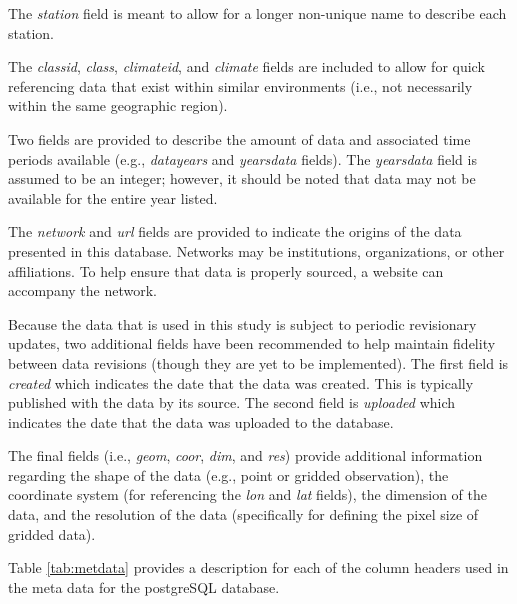 The \emph{station} field is meant to allow for a longer non-unique name to describe each station.

The  \emph{classid}, \emph{class}, \emph{climateid}, and \emph{climate} fields are included to allow for quick referencing data that exist within similar environments (i.e., not necessarily within the same geographic region). 

Two fields are provided to describe the amount of data and associated time periods available (e.g., \emph{data\textunderscore years} and \emph{years\textunderscore data} fields). 
The \emph{years\textunderscore data} field is assumed to be an integer; however, it should be noted that data may not be available for the entire year listed.

The \emph{network} and \emph{url} fields are provided to indicate the origins of the data presented in this database.  
Networks may be institutions, organizations, or other affiliations.  
To help ensure that data is properly sourced, a website can accompany the network.  

Because the data that is used in this study is subject to periodic revisionary updates, two additional fields have been recommended to help maintain fidelity between data revisions (though they are yet to be implemented).  
The first field is \emph{created} which indicates the date that the data was created.  
This is typically published with the data by its source.  
The second field is \emph{uploaded} which indicates the date that the data was uploaded to the database.  

The final fields (i.e., \emph{geom}, \emph{coor}, \emph{dim}, and \emph{res}) provide additional information regarding the shape of the data (e.g., point or gridded observation), the coordinate system (for referencing the \emph{lon} and \emph{lat} fields), the dimension of the data, and the resolution of the data (specifically for defining the pixel size of gridded data).

Table \ref{tab:metdata} provides a description for each of the column headers used in the meta data for the postgreSQL database.

